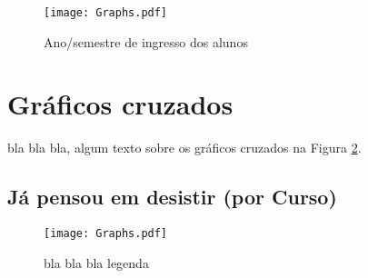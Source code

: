 \documentclass[11pt]{scrartcl} %
\begin{document}
\begin{figure}[h]
  \centering
  \texttt{[image: Graphs.pdf]}
  \label{fig:graph2}
  \caption{Ano/semestre de ingresso dos alunos}
\end{figure}


\section{Gráficos cruzados}\label{sec:cross}

bla bla bla, algum texto sobre os gráficos cruzados na Figura \ref{fig:graph10}.

\subsection{Já pensou em desistir (por Curso)}

\begin{figure}[h]
  \centering
  \texttt{[image: Graphs.pdf]}
  \label{fig:graph10}
  \caption{bla bla bla legenda}
\end{figure}

\end{document}
